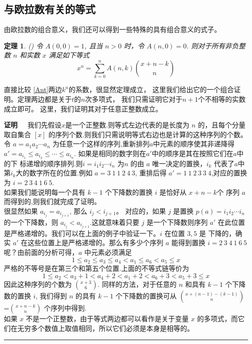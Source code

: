 \documentclass[a4paper,11pt,twoside]{book}
\newtheorem{thm}{定理}[section]
\def\qed{\nopagebreak\hfill{\rule{4pt}{7pt}}\medbreak}
\def\pf{{\bf 证明~~ }}
\begin{document}
\subsection{与欧拉数有关的等式}
由欧拉数的组合意义，我们还可以得到一些特殊的具有组合意义的式子。
\begin{thm}\label{t1}(\cite{Graham1994})
令 $A(0,0)=1$, 且当 $n>0$ 时，令 $A(n,0)=0$. 则对于所有非负整数 $n$
和实数 $x$ 满足如下等式
\begin{equation}\label{sm}
x^n=\sum_{k=0}^{n}A(n,k){x+n-k \choose n}
\end{equation}
\end{thm}

直接比较 \eqref{Ant}两边$k^n$的系数，很显然定理成立，
这里我们给出它的一个组合证明。定理两边都是关于$t$的$n$次多项式，
我们只需证明它对于$n+1$个不相等的实数成立即可。
这里，我们证明其对于任意正整数成立。

\pf 我们先假设$x$是一个正整数.则等式左边代表的是长度为 $n$
的，且每个分量取自集合 $[x]$
的序列个数.则我们只需说明等式右边也是计算的这种序列的个数。令
$a=a_{1}a_{2}\cdots a_n$
为任意一个这样的序列,重新排列$a$中元素的顺序使其非递降得
$a'=a_{i_{1}}\leq
a_{i_{2}}\leq \cdots \leq a_{i_{n}}$.
如果是相同的数字则在$a'$中的顺序是其在按照它们在$a$中的下
标递增的顺序排列.则$i=i_{1}i_{2}\cdots
i_{n}$ 为$n$ 的由 $a$ 唯一决定的置换，$i_{k}$
代表了$a$中第$i_{k}$大的数字所在的位置.例如 $a=3~1~1~2~4~3$,
重排后得 $a'=1~1~2~3~3~4$,对应的置换为 $i=2~3~4~1~6~5$.
\\
如果我们能说明每一个具有 $k-1$ 个下降数的置换 $i$ 是恰好从 $x+n-k$个
序列 $a$ 而得到的,则我们就完成了证明。
\\
很显然如果 $a_{i_{j}}=a_{i_{j+1}}$, 那么 $i_{j}<i_{j+1}$。
对应的，如果 $j$ 是置换 $p(a)=i_{1}i_{2}\cdots i_{n}$
的一个下降数，则 $a_{i_{j}}<a_{i_{j+1}}$.这就意味着只要 $j$
是一个下降数则序列 $a'$
在此位置是严格递增的。我们可以在上面的例子中验证一下。$i$ 在位置
$3,5$ 是 下降的，确实 $a'$
在这些位置上是严格递增的。那么有多少个序列 $a$ 能得到置换
$i=2~3~4~1~6~5$ 呢？由前面的分析可得，$a$ 中元素必须满足$$1\leq
a_{2}\leq a_{3} \leq a_{4} < a_{1} \leq a_6 <a_5 \leq x
$$严格的不等号是在第三个和第五个位置.上面的不等式链等价为
$$1\leq a_{2}< a_{3}+1
<a_{4}+2 < a_{1}+2 <a_6 +3 <a_5+3 \leq x$$ 因此这种序列的个数为
 ${x+3 \choose 6}$.
 同样的方法，对于任意的 $n$ 和具有 $k-1$ 个下降数的置换 $i$,
 我们得到 $n$ 的具有 $k-1$ 个下降数的置换可从
${x+(n-1)-(k-1)\choose n} $=${x+n-k \choose n}$ 个序列中得到.
\\如果 $x$ 不是一个正整数，由于等式两边都可以看作是关于变量 $x$
的多项式，而它们在无穷多个数值上取值相同，所以它们必须是本身是相等的。\qed
\end{document}
